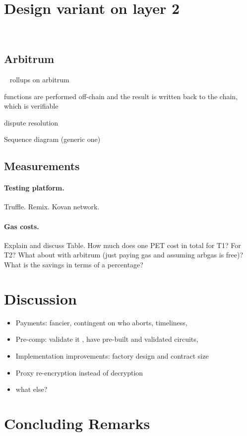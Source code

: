 
\section{Design variant on layer 2 }
\label{sec:arb}


~\subsection{Arbitrum}
~\cite{kalodner2018arbitrum}
rollups on arbitrum

functions are performed off-chain and the result is written back to the chain, which is verifiable

dispute resolution

Sequence diagram (generic one)

\subsection{Measurements}

\paragraph{Testing platform.} Truffle. Remix. Kovan network.  

\paragraph{Gas costs.} Explain and discuss Table. How much does one PET cost in total for T1? For T2? What about with arbitrum (just paying gas and assuming arbgas is free)? What is the savings in terms of a percentage?








\section{Discussion}

\begin{itemize}
\item Payments: fancier, contingent on who aborts, timeliness, \etc
\item Pre-comp: validate it , have pre-built and validated circuits, \etc
\item Implementation improvements: factory design and contract size
\item Proxy re-encryption instead of decryption
\item what else?
\end{itemize}


\section{Concluding Remarks}
